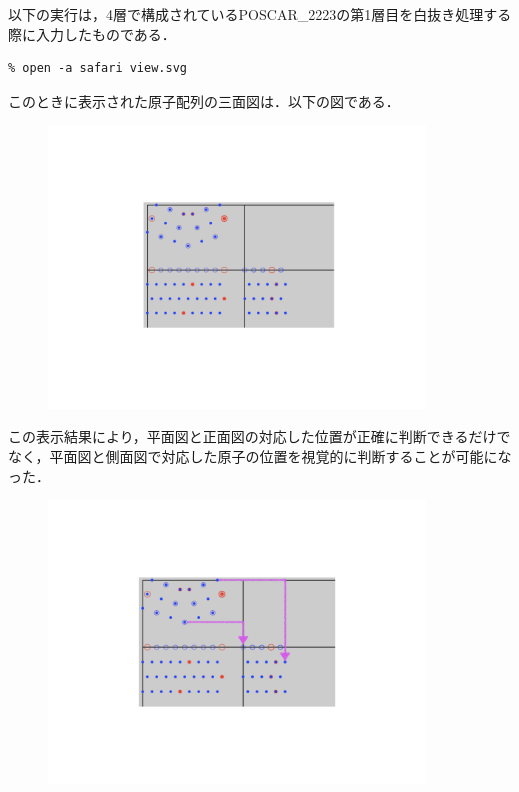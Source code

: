以下の実行は，4層で構成されているPOSCAR\_2223の第1層目を白抜き処理する際に入力したものである．
\begin{lstlisting}[style=customCsh,basicstyle={\scriptsize\ttfamily}]
% ruby viewer.rb POSCAR_2223 POSCAR_2223_4 1/4
% open -a safari view.svg 
\end{lstlisting}
このときに表示された原子配列の三面図は．以下の図である．

\begin{figure}[htbp]\begin{center}
\includegraphics[width=10cm,bb= 0 0 737 553]{../figs/./boundary_narita.015.jpeg}
\caption{}
\label{default}\end{center}\end{figure}
この表示結果により，平面図と正面図の対応した位置が正確に判断できるだけでなく，平面図と側面図で対応した原子の位置を視覚的に判断することが可能になった．

\begin{figure}[htbp]\begin{center}
\includegraphics[width=10cm,bb= 0 0 737 553]{../figs/./boundary_narita.016.jpeg}
\caption{}
\label{default}\end{center}\end{figure}
